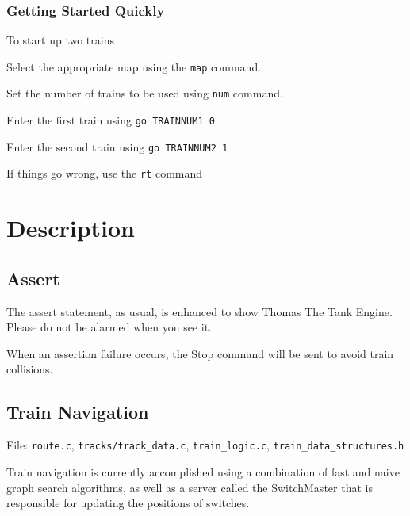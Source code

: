 \documentclass[letterpaper]{article}
\begin{document}
\subsubsection{Getting Started Quickly%
  \label{getting-started-quickly}%
}

To start up two trains
\begin{list}{.}
{
\setlength{\rightmargin}{\leftmargin}
}

\item Select the appropriate map using the \texttt{map} command.

\item Set the number of trains to be used using \texttt{num} command.

\item Enter the first train using \texttt{go TRAINNUM1 0}

\item Enter the second train using \texttt{go TRAINNUM2 1}

\item If things go wrong, use the \texttt{rt} command
\end{list}


\section{Description%
  \label{description}%
}


\subsection{Assert%
  \label{assert}%
}

The assert statement, as usual, is enhanced to show Thomas The Tank Engine. Please do not be alarmed when you see it.

When an assertion failure occurs, the Stop command will be sent to avoid train collisions.


\subsection{Train Navigation%
  \label{train-navigation}%
}

File: \texttt{route.c}, \texttt{tracks/track\_data.c}, \texttt{train\_logic.c}, \texttt{train\_data\_structures.h}

Train navigation is currently accomplished using a combination of fast and naive graph search algorithms, as well as a server called the SwitchMaster that is responsible for updating the positions of switches.
\end{document}
